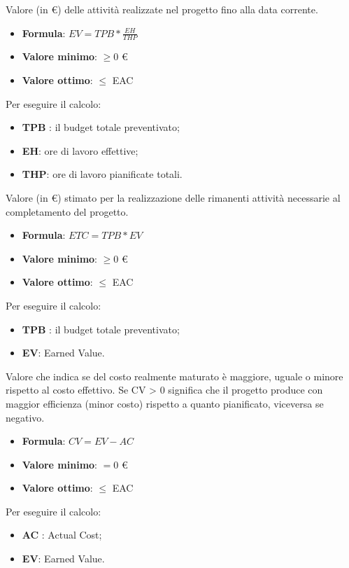 Valore (in \euro) delle attività realizzate nel progetto fino alla data corrente. 
\begin{itemize}
    \item \textbf{Formula}: $EV=TPB*\frac{EH}{THP}$
    \item \textbf{Valore minimo}: $\geq0$ \euro
    \item \textbf{Valore ottimo}: $\leq$ EAC
\end{itemize}  
Per eseguire il calcolo:
\begin{itemize}
    \item \textbf{TPB} : il budget totale preventivato;
    \item \textbf{EH}: ore di lavoro effettive;
    \item \textbf{THP}: ore di lavoro pianificate totali.
\end{itemize}

Valore (in \euro) stimato per la realizzazione delle rimanenti attività necessarie al completamento del progetto. 
\begin{itemize}
    \item \textbf{Formula}: $ETC=TPB*EV$
    \item \textbf{Valore minimo}: $\geq0$ \euro
    \item \textbf{Valore ottimo}: $\leq$ EAC
\end{itemize}  
Per eseguire il calcolo:
\begin{itemize}
    \item \textbf{TPB} : il budget totale preventivato;
    \item \textbf{EV}: Earned Value.
\end{itemize}

Valore che indica se del costo realmente maturato è maggiore, uguale o minore rispetto al costo effettivo.
Se CV > 0 significa che il progetto produce con maggior efficienza (minor costo) rispetto a quanto pianificato, viceversa se negativo. 
\begin{itemize}
    \item \textbf{Formula}: $CV=EV-AC$
    \item \textbf{Valore minimo}: $=0$ \euro
    \item \textbf{Valore ottimo}: $\leq$ EAC
\end{itemize}  
Per eseguire il calcolo:
\begin{itemize}
    \item \textbf{AC} : Actual Cost;
    \item \textbf{EV}: Earned Value.
\end{itemize}

